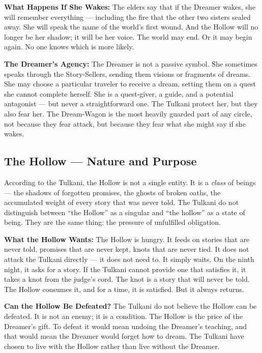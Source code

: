 \textbf{What Happens If She Wakes:} The elders say that if the Dreamer wakes, she will remember everything --- including the fire that the other two sisters sealed away. She will speak the name of the world's first wound. And the Hollow will no longer be her shadow; it will be her voice. The world may end. Or it may begin again. No one knows which is more likely.

\textbf{The Dreamer's Agency:} The Dreamer is not a passive symbol. She sometimes speaks through the Story-Sellers, sending them visions or fragments of dreams. She may choose a particular traveler to receive a dream, setting them on a quest she cannot complete herself. She is a quest-giver, a guide, and a potential antagonist --- but never a straightforward one. The Tulkani protect her, but they also fear her. The Dream-Wagon is the most heavily guarded part of any circle, not because they fear attack, but because they fear what she might say if she wakes.

\subsection*{The Hollow --- Nature and Purpose}
\label{subsec:tulkani-hollow}

According to the Tulkani, the Hollow is not a single entity. It is a \emph{class} of beings --- the shadows of forgotten promises, the ghosts of broken oaths, the accumulated weight of every story that was never told. The Tulkani do not distinguish between ``the Hollow'' as a singular and ``the hollow'' as a state of being. They are the same thing: the pressure of unfulfilled obligation.

\textbf{What the Hollow Wants:} The Hollow is hungry. It feeds on stories that are never told, promises that are never kept, knots that are never tied. It does not attack the Tulkani directly --- it does not need to. It simply waits. On the ninth night, it asks for a story. If the Tulkani cannot provide one that satisfies it, it takes a knot from the judge's cord. The knot is a story that will never be told. The Hollow consumes it, and for a time, it is satisfied. But it always returns.

\textbf{Can the Hollow Be Defeated?} The Tulkani do not believe the Hollow can be defeated. It is not an enemy; it is a condition. The Hollow is the price of the Dreamer's gift. To defeat it would mean undoing the Dreamer's teaching, and that would mean the Dreamer would forget how to dream. The Tulkani have chosen to live with the Hollow rather than live without the Dreamer.

